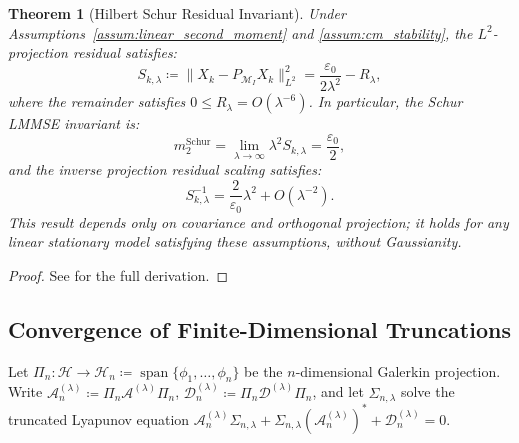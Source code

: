 \documentclass[11pt]{amsart}
\theoremstyle{plain}
\newtheorem{theorem}{Theorem}
\theoremstyle{definition}
\theoremstyle{remark}
\begin{document}
\begin{theorem}[Hilbert Schur Residual Invariant]
  \label{thm:inf_cancellation}
  Under Assumptions~\ref{assum:linear_second_moment} and \ref{assum:cm_stability}, the $L^2$-projection residual satisfies:
  \begin{equation}
    \label{eq:main_schur_sharp}
    S_{k,\lambda} \coloneqq \|X_k - P_{\mathcal{M}_I} X_k\|_{L^2}^2 = \frac{\varepsilon_0}{2\lambda^2} - R_\lambda,
  \end{equation}
  where the remainder satisfies $0 \le R_\lambda = O(\lambda^{-6})$. In particular, the Schur LMMSE invariant is:
  \begin{equation}
    \label{eq:m2_schur_value}
    m_2^{\mathrm{Schur}} = \lim_{\lambda\to\infty} \lambda^2 S_{k,\lambda} = \frac{\varepsilon_0}{2},
  \end{equation}
  and the inverse projection residual scaling satisfies:
  \begin{equation}
    \label{eq:schur_scaling_inverse}
    S_{k,\lambda}^{-1} = \frac{2}{\varepsilon_0}\lambda^2 + O(\lambda^{-2}).
  \end{equation}
  This result depends only on covariance and orthogonal projection; it holds for any linear stationary model satisfying these assumptions, without Gaussianity.
\end{theorem}
\begin{proof}
  See  for the full derivation.
\end{proof}

\subsection{Convergence of Finite-Dimensional Truncations}
\label{sec:proofs:convergence}

Let $\Pi_n: \mathcal{H} \to \mathcal{H}_n \coloneqq \operatorname{span}\{\phi_1, \ldots, \phi_n\}$ be the $n$-dimensional Galerkin projection. Write $\mathcal{A}_n^{(\lambda)} \coloneqq \Pi_n \mathcal{A}^{(\lambda)} \Pi_n$, $\mathcal{D}_n^{(\lambda)} \coloneqq \Pi_n \mathcal{D}^{(\lambda)} \Pi_n$, and let $\Sigma_{n,\lambda}$ solve the truncated Lyapunov equation $\mathcal{A}_n^{(\lambda)} \Sigma_{n,\lambda} + \Sigma_{n,\lambda} (\mathcal{A}_n^{(\lambda)})^* + \mathcal{D}_n^{(\lambda)} = 0$.
\end{document}
